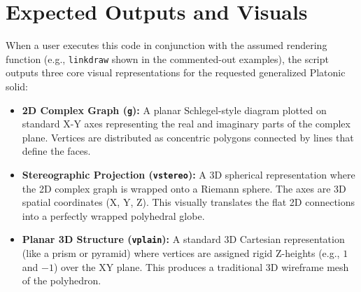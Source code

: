 \section{Expected Outputs and Visuals}
When a user executes this code in conjunction with the assumed rendering function (e.g., \texttt{linkdraw} shown in the commented-out examples), the script outputs three core visual representations for the requested generalized Platonic solid:
\begin{itemize}
    \item \textbf{2D Complex Graph (\texttt{g}):} A planar Schlegel-style diagram plotted on standard X-Y axes representing the real and imaginary parts of the complex plane. Vertices are distributed as concentric polygons connected by lines that define the faces.
    \item \textbf{Stereographic Projection (\texttt{vstereo}):} A 3D spherical representation where the 2D complex graph is wrapped onto a Riemann sphere. The axes are 3D spatial coordinates (X, Y, Z). This visually translates the flat 2D connections into a perfectly wrapped polyhedral globe.
    \item \textbf{Planar 3D Structure (\texttt{vplain}):} A standard 3D Cartesian representation (like a prism or pyramid) where vertices are assigned rigid Z-heights (e.g., $1$ and $-1$) over the XY plane. This produces a traditional 3D wireframe mesh of the polyhedron.
\end{itemize}
